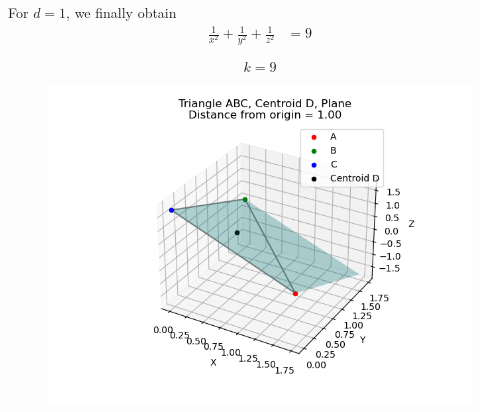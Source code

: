 \documentclass[journal]{IEEEtran}
\begin{document}
For $d=1$, we finally obtain
\begin{align}
\frac{1}{x^2} + \frac{1}{y^2} + \frac{1}{z^2} &= 9
\end{align}

\[
\boxed{k=9}
\]
\begin{figure}[H]
    \centering
    \includegraphics[width=0.55\linewidth]{figs/fig1.png}
    \caption{}
    \label{fig:fig1}
\end{figure}
\end{document}
